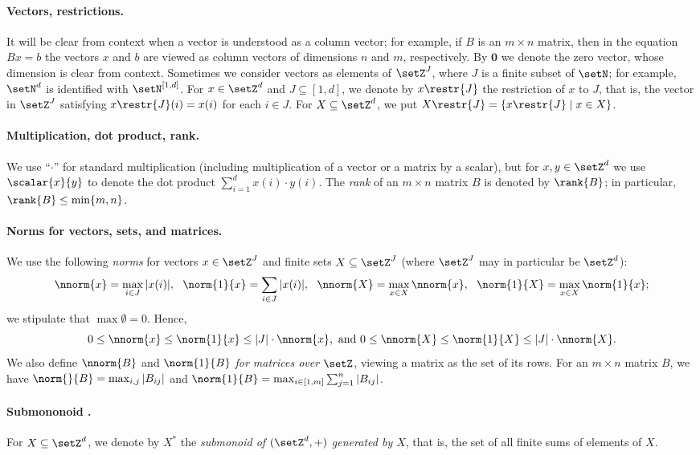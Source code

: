\paragraph{Vectors, restrictions.}
It will be clear from context when a vector is understood as a column vector; for example, if $B$ is an $m\times n$ matrix, then in the equation $Bx=b$ the vectors $x$ and $b$ are viewed as column vectors of dimensions $n$ and $m$, respectively. By $\mathbf{0}$ we denote the zero vector, whose dimension is clear from context.
Sometimes we consider vectors as elements of $\setZ^J$, where $J$ is a finite subset of $\setN$; for example, $\setN^d$ is identified with $\setN^{[1,d]}$.
For $x\in \setZ^d$ and $J\subseteq[1,d]$, we denote by $x\restr{J}$
the restriction of $x$ to $J$, that is, the vector in $\setZ^J$
satisfying $x\restr{J}(i)=x(i)$ for each $i\in J$. For
$X\subseteq\setZ^d$, we put $X\restr{J}=\{x\restr{J}\mid x\in X\}$.

\paragraph{Multiplication, dot product, rank.}
We use “$\cdot$” for standard multiplication (including multiplication of a vector or a matrix by a scalar), but for $x,y\in\setZ^d$ we use $\scalar{x}{y}$ to denote the dot product $\sum_{i=1}^d x(i)\cdot y(i)$.
The \emph{rank} of an $m\times n$ matrix $B$ is denoted by $\rank{B}$;
in particular, $\rank{B}\leq\min\{m,n\}$.

\paragraph{Norms for vectors, sets, and matrices.}
We use the following \emph{norms} for vectors $x\in\setZ^J$ and finite sets $X\subseteq\setZ^J$ (where $\setZ^J$ may in particular be $\setZ^d$):
\[
	\nnorm{x}=\max_{i\in J}|x(i)|, \ \ 
	\norm{1}{x}=\sum_{i\in J}|x(i)|, \ \ 
\nnorm{X}=\max_{x\in X}\nnorm{x}, \ \ 
	\norm{1}{X}=\max_{x\in X}\norm{1}{x};
\]
we stipulate that $\max\emptyset=0$.
Hence,
	\[0\leq\nnorm{x}\leq\norm{1}{x}\leq |J|\cdot\nnorm{x},
	{\textnormal{ and }}
0\leq\nnorm{X}\leq\norm{1}{X}\leq |J|\cdot\nnorm{X}.
	\]
We also define $\nnorm{B}$ and $\norm{1}{B}$ \emph{for matrices over
$\setZ$}, viewing a matrix as the set of its rows.
For an $m\times n$ matrix $B$, we have  
$\norm{}{B}=\max_{i,j}|B_{ij}|$ and
 $\norm{1}{B}=\max_{i\in[1,m]}\sum_{j=1}^n|B_{ij}|$.

\paragraph{Submononoid \bm{$X^*$}.} 
For $X\subseteq \setZ^d$, we denote by $X^*$ the \emph{submonoid of $(\setZ^d,+)$ generated by $X$}, that is, the set of all finite sums of elements of $X$.



